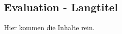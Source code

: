 \begin{showEvaluation}%
\chapter[Evaluation - Kurztitel für Inhaltsverzeichnis und Kolumnentitel]{Evaluation - Langtitel}%
\label{chap:Evaluation}
%
Hier kommen die Inhalte rein.
%
%
\end{showEvaluation}%
